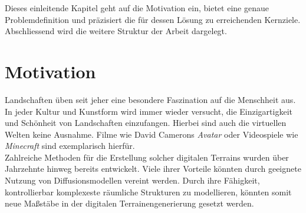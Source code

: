 Dieses einleitende Kapitel geht auf die Motivation ein, bietet eine genaue Problemdefinition und präzisiert die für dessen Lösung zu erreichenden Kernziele. Abschliessend wird die weitere Struktur der Arbeit dargelegt. 


\section{Motivation}

Landschaften üben seit jeher eine besondere Faszination auf die Menschheit aus. In jeder Kultur und Kunstform wird immer wieder versucht, die Einzigartigkeit und Schönheit von Landschaften einzufangen. Hierbei sind auch die virtuellen Welten keine Ausnahme. Filme wie David Camerons \textit{Avatar} oder Videospiele wie \textit{Minecraft} sind exemplarisch hierfür. \\
Zahlreiche Methoden für die Erstellung solcher digitalen Terrains wurden über Jahrzehnte hinweg bereits entwickelt. Viele ihrer Vorteile könnten durch geeignete Nutzung von Diffusionsmodellen vereint werden. Durch ihre Fähigkeit, kontrollierbar komplexeste räumliche Strukturen zu modellieren, könnten somit neue Maßstäbe in der digitalen Terrainengenerierung gesetzt werden.\\
